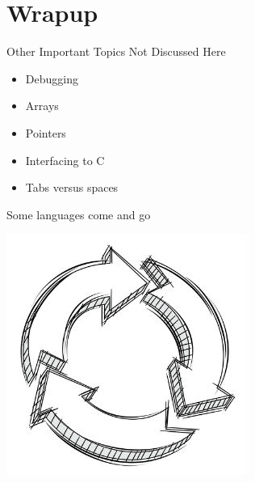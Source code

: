 \section{Wrapup}
\makesubcontentsslides



\begin{frame}
  \begin{block}{Other Important Topics Not Discussed Here}
    \begin{itemize}
      \item Debugging
      \item Arrays
      \item Pointers
      \item Interfacing to C
      \item Tabs versus spaces
    \end{itemize}
  \end{block}
\end{frame}


\begin{frame}
  \begin{block}{Some languages come and go}
    \begin{center}
      \includegraphics[scale=.7]{pics/lifecycle}
    \end{center}
  \end{block}
\end{frame}

